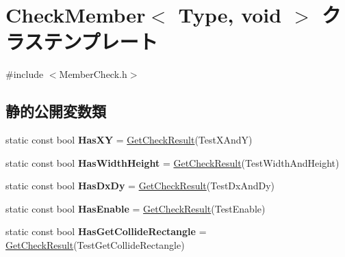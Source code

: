 \hypertarget{class_check_member_3_01_type_00_01void_01_4}{}\section{Check\+Member$<$ Type, void $>$ クラステンプレート}
\label{class_check_member_3_01_type_00_01void_01_4}


{\ttfamily \#include $<$Member\+Check.\+h$>$}

\subsection*{静的公開変数類}
\begin{DoxyCompactItemize}
\item 
static const bool {\bfseries Has\+XY} = \hyperlink{_member_check_8h_a422ea6f7b3ccc3c32c0b5a735d39a842}{Get\+Check\+Result}(Test\+X\+AndY)\hypertarget{class_check_member_3_01_type_00_01void_01_4_a26aa0c99fa1acc947e13f297ebc6f3d9}{}\label{class_check_member_3_01_type_00_01void_01_4_a26aa0c99fa1acc947e13f297ebc6f3d9}

\item 
static const bool {\bfseries Has\+Width\+Height} = \hyperlink{_member_check_8h_a422ea6f7b3ccc3c32c0b5a735d39a842}{Get\+Check\+Result}(Test\+Width\+And\+Height)\hypertarget{class_check_member_3_01_type_00_01void_01_4_a1ac29b2cad0aebcc84b90df6a4eece3f}{}\label{class_check_member_3_01_type_00_01void_01_4_a1ac29b2cad0aebcc84b90df6a4eece3f}

\item 
static const bool {\bfseries Has\+Dx\+Dy} = \hyperlink{_member_check_8h_a422ea6f7b3ccc3c32c0b5a735d39a842}{Get\+Check\+Result}(Test\+Dx\+And\+Dy)\hypertarget{class_check_member_3_01_type_00_01void_01_4_a76f45f1feaa00f683afe48d8a6b4f778}{}\label{class_check_member_3_01_type_00_01void_01_4_a76f45f1feaa00f683afe48d8a6b4f778}

\item 
static const bool {\bfseries Has\+Enable} = \hyperlink{_member_check_8h_a422ea6f7b3ccc3c32c0b5a735d39a842}{Get\+Check\+Result}(Test\+Enable)\hypertarget{class_check_member_3_01_type_00_01void_01_4_afc927c59a32437a7f2c4357533477fb6}{}\label{class_check_member_3_01_type_00_01void_01_4_afc927c59a32437a7f2c4357533477fb6}

\item 
static const bool {\bfseries Has\+Get\+Collide\+Rectangle} = \hyperlink{_member_check_8h_a422ea6f7b3ccc3c32c0b5a735d39a842}{Get\+Check\+Result}(Test\+Get\+Collide\+Rectangle)\hypertarget{class_check_member_3_01_type_00_01void_01_4_af7baa9cab51383674352553c95e01fe0}{}\label{class_check_member_3_01_type_00_01void_01_4_af7baa9cab51383674352553c95e01fe0}


\end{DoxyCompactItemize}
